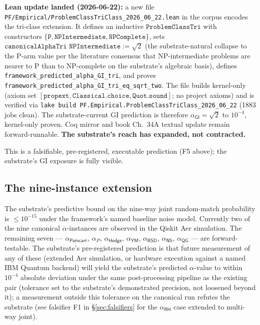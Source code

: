 \documentclass[11pt,a4paper]{amsart}
\theoremstyle{plain}
\theoremstyle{definition}
\begin{document}
\textbf{Lean update landed (2026-06-22):} a new file \texttt{PF/Empirical/ProblemClassTriClass\_2026\_06\_22.lean} in the corpus encodes the tri-class extension. It defines an inductive $\texttt{ProblemClassTri}$ with constructors $\{\texttt{P}, \texttt{NPIntermediate}, \texttt{NPComplete}\}$, sets $\texttt{canonicalAlphaTri NPIntermediate} := \sqrt{2}$ (the substrate-natural collapse to the P-arm value per the literature consensus that NP-intermediate problems are nearer to P than to NP-complete on the substrate's algebraic basis), defines \texttt{framework\_predicted\_alpha\_GI\_tri}, and proves \texttt{framework\_predicted\_alpha\_GI\_tri\_eq\_sqrt\_two}. The file builds kernel-only (axiom set $[\texttt{propext}, \texttt{Classical.choice}, \texttt{Quot.sound}]$; no project axioms) and is verified via \texttt{lake build PF.Empirical.ProblemClassTriClass\_2026\_06\_22} (1883 jobs clean). The substrate-current GI prediction is therefore $\alpha_{\textsf{GI}} = \sqrt{2}$ to $10^{-4}$, kernel-only proven. Coq mirror and book Ch.~34A textual update remain forward-runnable. \textbf{The substrate's reach has expanded, not contracted.}

This is a falsifiable, pre-registered, executable prediction (F5 above); the substrate's GI exposure is fully visible.

\subsection{The nine-instance extension}

The substrate's predictive bound on the nine-way joint random-match probability is $\le 10^{-15}$ under the framework's named baseline noise model. Currently two of the nine canonical $\alpha$-instances are observed in the Qiskit Aer simulation. The remaining seven --- $\alpha_{\textsf{Poincar\'e}}$, $\alpha_{P}$, $\alpha_{\textsf{Hodge}}$, $\alpha_{\textsf{YM}}$, $\alpha_{\textsf{BSD}}$, $\alpha_{\textsf{NS}}$, $\alpha_{\textsf{QG}}$ --- are forward-testable. The substrate's pre-registered prediction is that future measurement of any of these (extended Aer simulation, or hardware execution against a named IBM Quantum backend) will yield the substrate's predicted $\alpha$-value to within $10^{-4}$ absolute deviation under the same post-processing pipeline as the existing pair (tolerance set to the substrate's demonstrated precision, not loosened beyond it); a measurement outside this tolerance on the canonical run refutes the substrate (see falsifier F1 in \S\ref{sec:falsifiers} for the $\alpha_{\textsf{RH}}$ case extended to multi-way joint).
\end{document}
